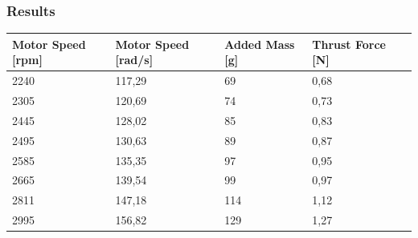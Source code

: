 \subsubsection{Results}
\begin{table}[H]
	\centering
	\begin{tabular}{|l|l|l|l|p{4.3cm}|}
		\hline%
		\textbf{Motor Speed [rpm]}    & \textbf{Motor Speed [rad/s]} & \textbf{Added Mass [g]}  & \textbf{Thrust Force [N]} \\ 
		\hline%
		2240                        	   &  117,29                           & 69                       & 0,68         \\
		\hline%
		2305 						       &  120,69				           & 74                       & 0,73         \\
		\hline%
		2445                               &  128,02   			               & 85                       & 0,83         \\
		\hline%
		2495                               &  130,63  			               & 89                       & 0,87         \\
		\hline%
		2585                               &  135,35                           & 97                       & 0,95         \\
		\hline%
		2665 						       &  139,54				           & 99                       & 0,97         \\
		\hline%
		2811                               &  147,18    			           & 114                      & 1,12         \\
		\hline%
		2995                               &  156,82                           & 129                      & 1,27         \\

\end{tabular}
\end{table}
